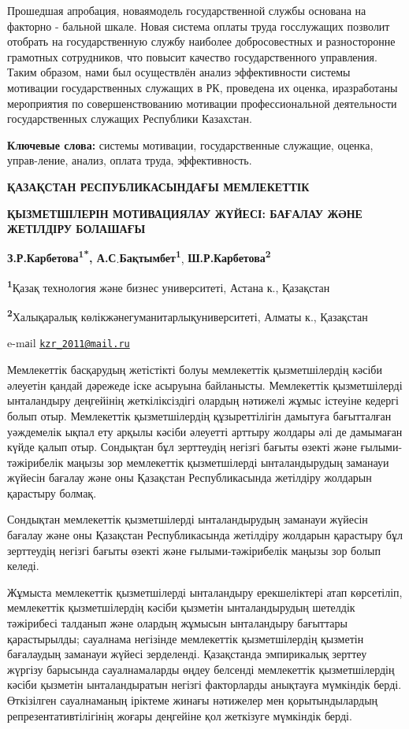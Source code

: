 Прошедшая апробация, новаямодель государственной службы основана на
факторно - бальной шкале. Новая система оплаты труда госслужащих
позволит отобрать на государственную службу наиболее добросовестных и
разносторонне грамотных сотрудников, что повысит качество
государственного управления. Таким образом, нами был осуществлён анализ
эффективности системы мотивации государственных служащих в РК, проведена
их оценка, иразработаны мероприятия по совершенствованию мотивации
профессиональной деятельности государственных служащих Республики
Казахстан.

{\bfseries Ключевые слова:} системы мотивации, государственные служащие,
оценка, управ-ление, анализ, оплата труда, эффективность.

\begin{center}
{\large\bfseries ҚАЗАҚСТАН РЕСПУБЛИКАСЫНДАҒЫ МЕМЛЕКЕТТІК}

{\bfseries ҚЫЗМЕТШІЛЕРІН МОТИВАЦИЯЛАУ ЖҮЙЕСІ: БАҒАЛАУ ЖӘНЕ ЖЕТІЛДІРУ
БОЛАШАҒЫ}

{\bfseries З.Р.Карбетова\textsuperscript{1*},
А.С}.{\bfseries Бақтымбет\textsuperscript{1}},
{\bfseries Ш.Р.Карбетова\textsuperscript{2}}

{\bfseries \textsuperscript{1}}Қазақ технология және бизнес университеті,
Астана к., Қазақстан

{\bfseries \textsuperscript{2}}Халықаралық
көлікжәнегуманитарлықуниверситеті, Алматы к., Қазақстан

e-mаil \href{mailto:kzr_2011@mail.ru}{\nolinkurl{kzr\_2011@mail.ru}}
\end{center}

Мемлекеттік басқарудың жетістікті болуы мемлекеттік қызметшілердің
кәсіби әлеуетін қандай дәрежеде іске асыруына байланысты. Мемлекеттік
қызметшілерді ынталандыру деңгейінің жеткіліксіздігі олардың нәтижелі
жұмыс істеуіне кедергі болып отыр. Мемлекеттік қызметшілердің
құзыреттілігін дамытуға бағытталған уәждемелік ықпал ету арқылы кәсіби
әлеуетті арттыру жолдары әлі де дамымаған күйде қалып отыр. Сондықтан
бұл зерттеудің негізгі бағыты өзекті және ғылыми-тәжірибелік маңызы зор
мемлекеттік қызметшілерді ынталандырудың заманауи жүйесін бағалау және
оны Қазақстан Республикасында жетілдіру жолдарын қарастыру болмақ.

Сондықтан мемлекеттік қызметшілерді ынталандырудың заманауи жүйесін
бағалау және оны Қазақстан Республикасында жетілдіру жолдарын қарастыру
бұл зерттеудің негізгі бағыты өзекті және ғылыми-тәжірибелік маңызы зор
болып келеді.

Жұмыста мемлекеттік қызметшілерді ынталандыру ерекшеліктері атап
көрсетіліп, мемлекеттік қызметшілердің кәсіби қызметін ынталандырудың
шетелдік тәжірибесі талданып және олардың жұмысын ынталандыру бағыттары
қарастырылды; сауалнама негізінде мемлекеттік қызметшілердің қызметін
бағалаудың заманауи жүйесі зерделенді. Қазақстанда эмпирикалық зерттеу
жүргізу барысында сауалнамаларды өңдеу белсенді мемлекеттік
қызметшілердің кәсіби қызметін ынталандыратын негізгі факторларды
анықтауға мүмкіндік берді. Өткізілген сауалнаманың іріктеме жинағы
нәтижелер мен қорытындылардың репрезентативтілігінің жоғары деңгейіне
қол жеткізуге мүмкіндік берді.

